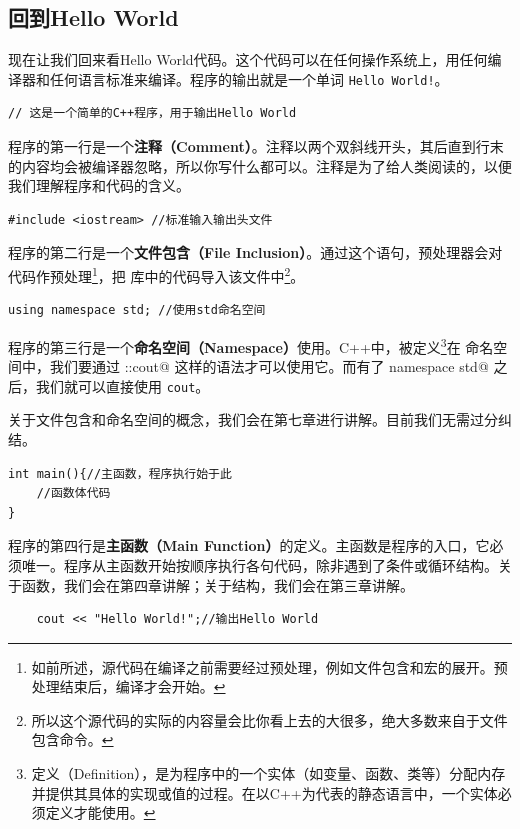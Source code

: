 \subsection*{回到Hello World}
现在让我们回来看Hello World代码。这个代码可以在任何操作系统上，用任何编译器和任何语言标准来编译。程序的输出就是一个单词 \texttt{Hello World!}。\par
\begin{lstlisting}
// 这是一个简单的C++程序，用于输出Hello World
\end{lstlisting}
程序的第一行是一个\textbf{注释（Comment）}。注释以两个双斜线开头，其后直到行末的内容均会被编译器忽略，所以你写什么都可以。注释是为了给人类阅读的，以便我们理解程序和代码的含义。\par
\begin{lstlisting}
#include <iostream> //标准输入输出头文件
\end{lstlisting}
程序的第二行是一个\textbf{文件包含（File Inclusion）}。通过这个语句，预处理器会对代码作预处理\footnote{如前所述，源代码在编译之前需要经过预处理，例如文件包含和宏的展开。预处理结束后，编译才会开始。}，把 \lstinline@iostream@ 库中的代码导入该文件中\footnote{所以这个源代码的实际的内容量会比你看上去的大很多，绝大多数来自于文件包含命令。}。\par
\begin{lstlisting}
using namespace std; //使用std命名空间
\end{lstlisting}
程序的第三行是一个\textbf{命名空间（Namespace）}使用。C++中，\lstinline@cout@ 被定义\footnote{定义（Definition），是为程序中的一个实体（如变量、函数、类等）分配内存并提供其具体的实现或值的过程。在以C++为代表的静态语言中，一个实体必须定义才能使用。}在 \lstinline@std@ 命名空间中，我们要通过 \lstinline@std::cout@ 这样的语法才可以使用它。而有了 \lstinline@using namespace std@ 之后，我们就可以直接使用 \lstinline{cout}。\par
关于文件包含和命名空间的概念，我们会在第七章进行讲解。目前我们无需过分纠结。\par
\begin{lstlisting}
int main(){//主函数，程序执行始于此
    //函数体代码
}
\end{lstlisting}
程序的第四行是\textbf{主函数（Main Function）}的定义。主函数是程序的入口，它必须唯一。程序从主函数开始按顺序执行各句代码，除非遇到了条件或循环结构。关于函数，我们会在第四章讲解；关于结构，我们会在第三章讲解。\par
\begin{lstlisting}
    cout << "Hello World!";//输出Hello World
\end{lstlisting}
